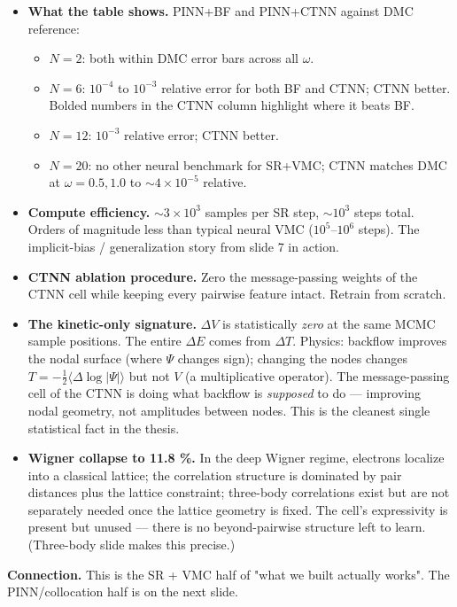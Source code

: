\documentclass[11pt]{article}
\begin{document}
\begin{itemize}
\item \textbf{What the table shows.} PINN+BF and PINN+CTNN against DMC reference:
\begin{itemize}
\item $N = 2$: both within DMC error bars across all $\omega$.
\item $N = 6$: $10^{-4}$ to $10^{-3}$ relative error for both BF and CTNN;
CTNN better. Bolded numbers in the CTNN column highlight where it
beats BF.
\item $N = 12$: $10^{-3}$ relative error; CTNN better.
\item $N = 20$: no other neural benchmark for SR+VMC; CTNN matches DMC at
$\omega = 0.5, 1.0$ to $\sim 4 \times 10^{-5}$ relative.
\end{itemize}
\item \textbf{Compute efficiency.} $\sim 3 \times 10^3$ samples per SR step, $\sim
  10^3$ steps total. Orders of magnitude less than typical neural VMC
($10^5$--$10^6$ steps). The implicit-bias / generalization story from
slide 7 in action.
\item \textbf{CTNN ablation procedure.} Zero the message-passing weights of the
CTNN cell while keeping every pairwise feature intact. Retrain from
scratch.
\item \textbf{The kinetic-only signature.} $\Delta V$ is statistically \emph{zero} at the
same MCMC sample positions. The entire $\Delta E$ comes from $\Delta T$.
Physics: backflow improves the nodal surface (where $\Psi$ changes
sign); changing the nodes changes $T = -\frac12 \langle \Delta \log
  |\Psi| \rangle$ but not $V$ (a multiplicative operator). The
message-passing cell of the CTNN is doing what backflow is \emph{supposed}
to do --- improving nodal geometry, not amplitudes between nodes. This
is the cleanest single statistical fact in the thesis.
\item \textbf{Wigner collapse to 11.8 \%.} In the deep Wigner regime, electrons
localize into a classical lattice; the correlation structure is
dominated by pair distances plus the lattice constraint; three-body
correlations exist but are not separately needed once the lattice
geometry is fixed. The cell's expressivity is present but unused --- there
is no beyond-pairwise structure left to learn. (Three-body slide makes
this precise.)
\end{itemize}
\textbf{Connection.} This is the SR + VMC half of "what we built actually
works". The PINN/collocation half is on the next slide.
\end{document}
